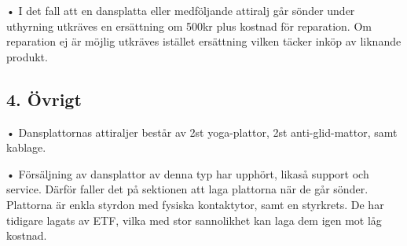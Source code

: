 \documentclass{dsekkallelse}
\begin{document}
• I det fall att en dansplatta eller medföljande attiralj går sönder under uthyrning utkräves
en ersättning om 500kr plus kostnad för reparation. Om reparation ej är möjlig utkräves
istället ersättning vilken täcker inköp av liknande produkt.

\subsection{4. Övrigt}

• Dansplattornas attiraljer består av 2st yoga-plattor, 2st anti-glid-mattor, samt kablage.

• Försäljning av dansplattor av denna typ har upphört, likaså support och service. Därför
faller det på sektionen att laga plattorna när de går sönder. Plattorna är enkla styrdon
med fysiska kontaktytor, samt en styrkrets. De har tidigare lagats av ETF, vilka med stor
sannolikhet kan laga dem igen mot låg kostnad.
\end{document}
